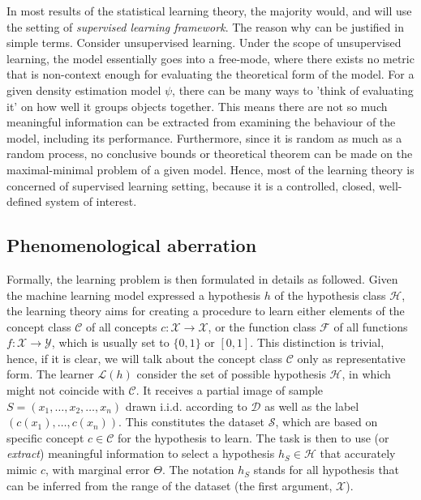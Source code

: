 \documentclass[
  journal=largetwo,
  year=2025,
  volume=37,
]{cup-journal}
\begin{document}
In most results of the statistical learning theory, the majority would, and will use the setting of \textit{supervised learning framework}. The reason why can be justified in simple terms. Consider unsupervised learning. Under the scope of unsupervised learning, the model essentially goes into a free-mode, where there exists no metric that is non-context enough for evaluating the theoretical form of the model. For a given density estimation model $\psi$, there can be many ways to 'think of evaluating it' on how well it groups objects together. This means there are not so much meaningful information can be extracted from examining the behaviour of the model, including its performance. Furthermore, since it is random as much as a random process, no conclusive bounds or theoretical theorem can be made on the maximal-minimal problem of a given model. Hence, most of the learning theory is concerned of supervised learning setting, because it is a controlled, closed, well-defined system of interest. 

\subsection{Phenomenological aberration}

Formally, the learning problem is then formulated in details as followed. Given the machine learning model expressed a hypothesis $h$ of the hypothesis class $\mathcal{H}$, the learning theory aims for creating a procedure to learn either elements of the concept class $\mathcal{C}$ of all concepts $c: \mathcal{X}\to \mathcal{X}$, or the function class $\mathcal{F}$ of all functions $f: \mathcal{X}\to \mathcal{Y}$, which is usually set to $\{0,1\}$ or $[0,1]$. This distinction is trivial, hence, if it is clear, we will talk about the concept class $\mathcal{C}$ only as representative form. The learner $\mathcal{L}(h)$ consider the set of possible hypothesis $\mathcal{H}$, in which might not coincide with $\mathcal{C}$. It receives a partial image of sample $S=(x_{1},\dots,x_{2},\dots,x_n)$ drawn i.i.d. according to $\mathcal{D}$ as well as the label $(c(x_1),\dots,c(x_n))$. This constitutes the dataset $\mathcal{S}$, which are based on specific concept $c\in \mathcal{C}$ for the hypothesis to learn. The task is then to use (or \textit{extract}) meaningful information to select a hypothesis $h_{S}\in \mathcal{H}$ that accurately mimic $c$, with marginal error $\Theta$. The notation $h_{S}$ stands for all hypothesis that can be inferred from the range of the dataset (the first argument, $\mathcal{X}$). 
\end{document}

